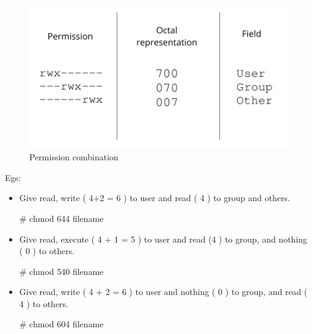 \begin{flushleft}
\begin{figure}[h!]
	\centering
	\includegraphics[scale=0.4]{content/chapter5/images/perm5.png}
	\caption{Permission combination}
	\label{fig:combination_permission2}
\end{figure}


\newpage
Egs:
	\begin{itemize}
		\item 	Give read, write ( 4+2 = 6 ) to user and read ( 4 ) to group and others.
		\begin{tcolorbox}[breakable,notitle,boxrule=-0pt,colback=black,colframe=black]
			\color{green}
			\font=9pt
			\# chmod 644 filename
			\font=4pt
		\end{tcolorbox}
		\bigskip
		
		\item Give read, execute ( 4 + 1 = 5 ) to user and read (4 ) to group, and nothing ( 0 ) to others.
		\bigskip
		\begin{tcolorbox}[breakable,notitle,boxrule=-0pt,colback=black,colframe=black]
			\color{green}
			\font=9pt
			\# chmod 540 filename
			\font=4pt
		\end{tcolorbox}

	\bigskip
	\item Give read, write ( 4 + 2 = 6 ) to user and nothing ( 0 ) to group, and read ( 4 ) to others.
	\bigskip
	\begin{tcolorbox}[breakable,notitle,boxrule=-0pt,colback=black,colframe=black]
		\color{green}
		\font=9pt
		\# chmod 604 filename
		\font=4pt
	\end{tcolorbox}
	\end{itemize}

	\newpage

\end{flushleft}
